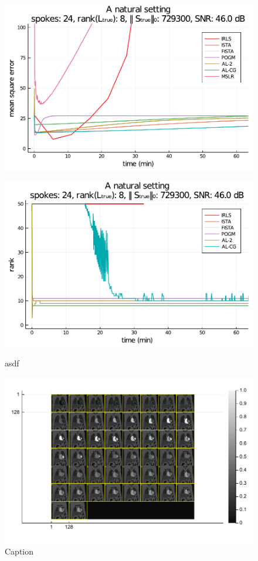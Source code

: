 \begin{figure}
    \centering
    \begin{minipage}{0.48\linewidth}
        \centering
        \includegraphics[width=\linewidth]{images/orig_MSE.pdf}
        \label{fig:orig_MSE}
    \end{minipage}
    \begin{minipage}{0.48\linewidth}
        \centering
        \includegraphics[width=\linewidth]{images/orig_rank.pdf}
        \label{fig:orig_rank}
    \end{minipage}
    \caption{asdf}
    \label{fig:orig}
\end{figure}

\begin{figure}
    \centering
    \includegraphics[width=0.46\linewidth]{images/PINCAT_all.pdf}
    \caption{Caption}
    \label{fig:PINCAT_all}
\end{figure}

